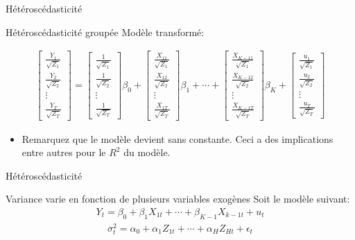 \documentclass{beamer}
\begin{document}
\begin{frame}{Hétéroscédasticité}
\begin{block}{Hétéroscédasticité groupée}
Modèle transformé:

\begin{align*}
\begin{bmatrix} 
\frac{Y_1}{\sqrt{Z_1}}\\
\frac{Y_2}{\sqrt{Z_2}}\\
\vdots \\
\frac{Y_T}{\sqrt{Z_T}}
\end{bmatrix}
= 
\begin{bmatrix} 
\frac{1}{\sqrt{Z_1}}\\
\frac{1}{\sqrt{Z_2}}\\
\vdots \\
\frac{1}{\sqrt{Z_T}}
\end{bmatrix}
\beta_0
+
\begin{bmatrix} 
\frac{X_{11}}{\sqrt{Z_1}}\\
\frac{X_{12}}{\sqrt{Z_2}}\\
\vdots \\
\frac{X_{1T}}{\sqrt{Z_T}}
\end{bmatrix}
\beta_1
+ \cdots + 
\begin{bmatrix} 
\frac{X_{K-11}}{\sqrt{Z_1}}\\
\frac{X_{K-12}}{\sqrt{Z_2}}\\
\vdots \\
\frac{X_{K-1T}}{\sqrt{Z_T}}
\end{bmatrix}
\beta_K 
+
\begin{bmatrix} 
\frac{u_1}{\sqrt{Z_1}}\\
\frac{u_2}{\sqrt{Z_2}}\\
\vdots \\
\frac{u_T}{\sqrt{Z_T}}
\end{bmatrix}
\end{align*}
\begin{itemize}
\item Remarquez que le modèle devient sans constante. Ceci a des implications entre autres pour le $R^2$ du modèle.
\end{itemize}
\end{block}
\end{frame}

\begin{frame}{Hétéroscédasticité}
\begin{block}{Variance varie en fonction de plusieurs variables exogènes}
Soit le modèle suivant:
\begin{align*}
Y_t=\beta_0 + \beta_1 X_{1t}+\cdots+ \beta_{K-1} X_{k-1t}+u_t
\end{align*}
\begin{align*}
\sigma_t^2=\alpha_0+\alpha_1 Z_{1t}+\cdots+\alpha_H Z_{Ht}+\epsilon_t
\end{align*}
\end{block}
\end{frame}
\end{document}
